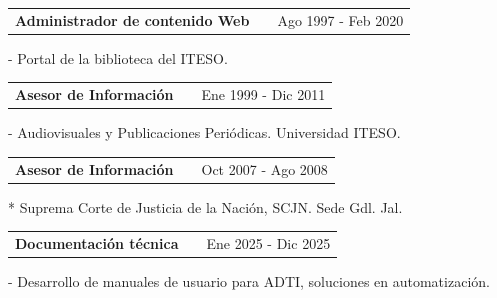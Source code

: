 \documentclass[a4paper,12pt]{article}
\makeatletter
\newenvironment{jobshort}[2]
    {
    \begin{tabularx}{\linewidth}{@{}l X r@{}}
    \textbf{#1} & \hfill &  #2 \\[3.75pt]
    \end{tabularx}
    }
    {
    }
\newenvironment{joblong}[2]
    {
    \begin{tabularx}{\linewidth}{@{}l X r@{}}
    \textbf{#1} & \hfill &  #2 \\[3.75pt]
    \end{tabularx}
    \begin{minipage}[t]{\linewidth}
    \begin{itemize}[nosep,after=\strut, leftmargin=1em, itemsep=3pt,label=--]
    }
    {
    \end{itemize}
    \end{minipage}    
    }
\makeatother
\begin{document}
\begin{jobshort}{Administrador de contenido Web}{Ago 1997 - Feb 2020}
- Portal de la biblioteca del ITESO.
\end{jobshort}


\begin{jobshort}{Asesor de Información}{Ene 1999 - Dic 2011}
- Audiovisuales y Publicaciones Periódicas. Universidad ITESO.
\end{jobshort}


\begin{jobshort}{Asesor de Información}{Oct 2007 - Ago 2008}
* Suprema Corte de Justicia de la Nación, SCJN. Sede Gdl. Jal. 
\end{jobshort}

\begin{jobshort}{Documentación técnica}{Ene 2025 - Dic 2025}
- Desarrollo de manuales de usuario para ADTI, soluciones en automatización. 
\end{jobshort}

  

\end{document}
